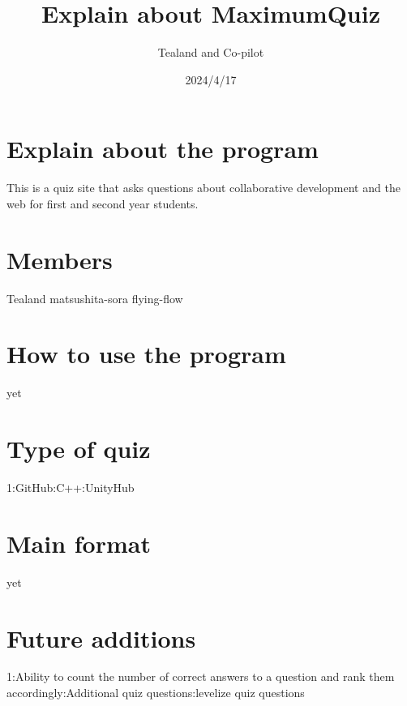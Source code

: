 \documentclass{article}%
\title{Explain about MaximumQuiz}  %
\author{Tealand and Co-pilot}
\date{2024/4/17}
\begin{document}
\maketitle

\section{Explain about the program}

This is a quiz site that asks questions about collaborative development and the web for first and second year students.


\section{Members}

Tealand
matsushita-sora
flying-flow

\section{How to use the program}

yet

\section{Type of quiz}

1:GitHub:C++:UnityHub\newline


\section{Main format}

yet

\section{Future additions}
1:Ability to count the number of correct answers to a question and rank them accordingly:Additional quiz questions:levelize quiz questions\newline
\end{document}
